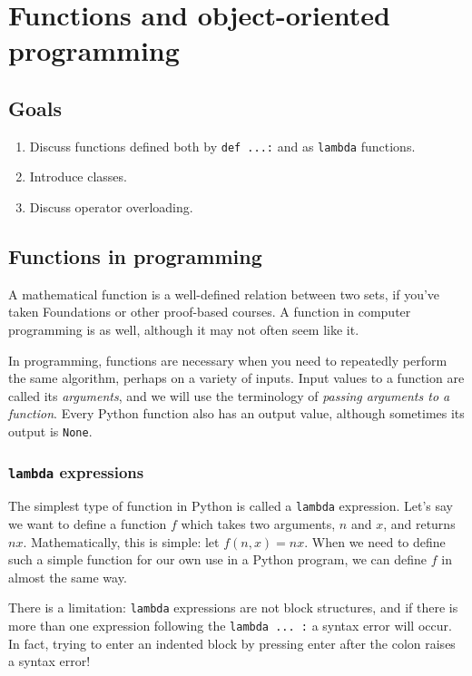 \documentclass[m3380-lec-main.tex]{subfiles}
\begin{document}
\chapter{Functions and object-oriented programming}

\section*{Goals}
\begin{enumerate}[1.~]\setlength{\itemsep}{0pt}
\item Discuss functions defined both by \verb|def ...:| and as \verb|lambda| functions.
\item Introduce classes.
\item Discuss operator overloading.
\end{enumerate}

\section{Functions in programming}
A mathematical function is a well-defined relation between two sets, if you've taken Foundations or other proof-based courses. A function in computer programming is as well, although it may not often seem like it.

In programming, functions are necessary when you need to repeatedly perform the same algorithm, perhaps on a variety of inputs. Input values to a function are called its \emph{arguments}, and we will use the terminology of \emph{passing arguments to a function}. Every Python function also has an output value, although sometimes its output is \verb|None|.

\subsection{\texttt{lambda} expressions}
The simplest type of function in Python is called a \verb|lambda| expression. Let's say we want to define a function $f$ which takes two arguments, $n$ and $x$, and returns $nx$. Mathematically, this is simple: let $f(n,x)=nx$. When we need to define such a simple function for our own use in a Python program, we can define $f$ in almost the same way.

\smallskip\noindent
There is a limitation: \verb|lambda| expressions are not block structures, and if there is more than one expression following the \verb|lambda ... :| a syntax error will occur. In fact, trying to enter an indented block by pressing enter after the colon raises a syntax error!
\end{document}
